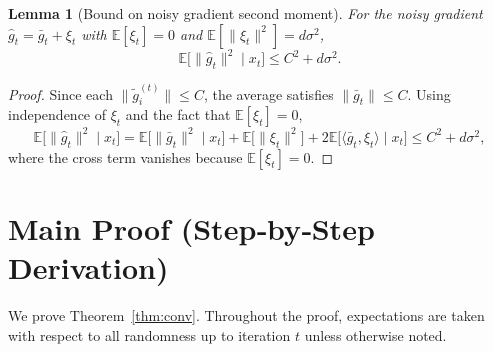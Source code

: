 \documentclass{article}
\newtheorem{lemma}{Lemma}
\newcommand{\EE}{\mathbb{E}}
\begin{document}
\begin{lemma}[Bound on noisy gradient second moment]\label{lem:noise}
For the noisy gradient $\hat g_t=\bar g_t+\xi_t$ with $\EE[\xi_t]=0$ and
$\EE[\|\xi_t\|^{2}]=d\sigma^{2}$,
\[
\EE\!\bigl[\|\hat g_t\|^{2}\mid x_t\bigr]
\le C^{2}+d\sigma^{2}.
\]
\end{lemma}
\begin{proof}
Since each $\|\tilde g_i^{(t)}\|\le C$, the average satisfies $\|\bar g_t\|\le C$.
Using independence of $\xi_t$ and the fact that $\EE[\xi_t]=0$,
\[
\EE\!\bigl[\|\hat g_t\|^{2}\mid x_t\bigr]
= \EE\!\bigl[\|\bar g_t\|^{2}\mid x_t\bigr]
  +\EE\!\bigl[\|\xi_t\|^{2}\bigr]
  +2\EE\!\bigl[\langle\bar g_t,\xi_t\rangle\mid x_t\bigr]
\le C^{2}+d\sigma^{2},
\]
where the cross term vanishes because $\EE[\xi_t]=0$. \qedhere
\end{proof}

\newpage
\section*{Main Proof (Step‑by‑Step Derivation)}
We prove Theorem~\ref{thm:conv}. Throughout the proof, expectations are taken
with respect to all randomness up to iteration $t$ unless otherwise noted.
\end{document}
